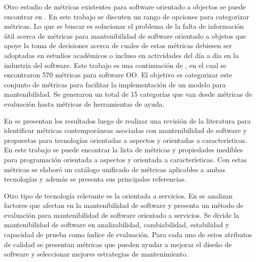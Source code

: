Otro estudio de métricas existentes para software orientado a objectos se puede
encontrar en \cite{TowardsACatalog}. En este trabajo se discuten un rango de
opciones para categorizar métricas. Lo que se buscar es solucionar el problema
de la falta de información útil acerca de métricas para mantenibilidad de 
software orientado a objetos que apoye la toma de decisiones acerca de cuales
de estas métricas debiesen ser adoptadas en estudios académicos o incluso
en actividades del día a día en la industria del software. Este trabajo
es una continuación de \cite{roadmap}, en el cual se encontraron 570
métricas para software OO. El objetivo es categorizar este conjunto de métricas
 para facilitar la implementación de un modelo para mantenibilidad. 
 Se generaron un total de 15 categorías que van desde métricas de evaluación
 hasta métricas de herramientas de ayuda.

 En \cite{SystematicReview} se presentan los resultados luego de realizar
 una revisión de la literatura para identificar métricas contemporáneas 
 asociadas con mantenibilidad de software y propuestas para tecnologías
 orientadas a aspectos y orientadas a características. En este trabajo
 se puede encontrar la lista de métricas y propiedades medibles para programación
 orientada a aspectos y orientada a características. Con estas métricas se 
 elaboró un catálogo unificado de métricas aplicables a ambas tecnologías
 y además se presenta sus principales referencias.

 Otro tipo de tecnología relevante es la orientada a servicios. En
 \cite{ResearchOnMaintainability} se analizan factores que afectan en la mantenibilidad
 de software y presenta un método de evaluación para mantenibilidad de software
 orientado a servicios. Se divide la mantenibilidad de software en analizabilidad,
cambiabilidad, estabilidad y capacidad de prueba como índice de evaluación. Para
cada uno de estos atributos de calidad se presentan métricas que pueden ayudar
a mejorar el diseño de software y seleccionar mejores estrategias de mantenimiento.

